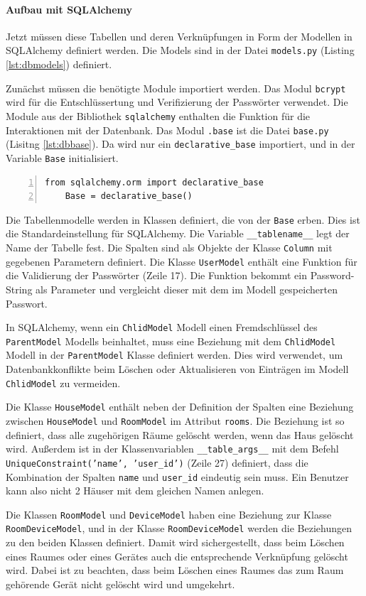 \documentclass[12pt, letterpaper]{article}
\begin{document}
  \paragraph{Aufbau mit SQLAlchemy}
  \par \textbf{}
  \par Jetzt müssen diese Tabellen und deren Verknüpfungen in Form der Modellen in SQLAlchemy definiert werden. Die Models sind in der Datei \texttt{models.py} (Listing \ref{lst:dbmodels}) definiert. 
  \par Zunächst müssen die benötigte Module importiert werden. Das Modul \texttt{bcrypt} wird für die Entschlüssertung und Verifizierung der Passwörter verwendet. Die Module aus der Bibliothek \texttt{sqlalchemy} enthalten die Funktion für die Interaktionen mit der Datenbank. Das Modul \texttt{.base} ist die Datei \texttt{base.py} (Lisitng \ref{lst:dbbase}). Da wird nur ein \texttt{declarative\_base} importiert, und in der Variable \texttt{Base} initialisiert. 
  \begin{lstlisting}[frame=single, style=py, numbers=left, label={lst:dbbase}, caption={db: base.py}]
    from sqlalchemy.orm import declarative_base
    Base = declarative_base()
  \end{lstlisting}  
  \par Die Tabellenmodelle werden in Klassen definiert, die von der \texttt{Base} erben. Dies ist die Standardeinstellung für SQLAlchemy. Die Variable \texttt{\_\_tablename\_\_} legt der Name der Tabelle fest. Die Spalten sind als Objekte der Klasse \texttt{Column} mit gegebenen Parametern definiert. Die Klasse \texttt{UserModel} enthält eine Funktion für die Validierung der Passwörter (Zeile 17). Die Funktion bekommt ein Password-String als Parameter und vergleicht dieser mit dem im Modell gespeicherten Passwort.
  \par In SQLAlchemy, wenn ein \texttt{ChlidModel} Modell einen Fremdschlüssel des \texttt{ParentModel} Modells beinhaltet, muss eine Beziehung mit dem \texttt{ChlidModel} Modell in der \texttt{ParentModel} Klasse definiert werden. Dies wird verwendet, um Datenbankkonflikte beim Löschen oder Aktualisieren von Einträgen im Modell \texttt{ChlidModel} zu vermeiden.
  \par Die Klasse \texttt{HouseModel} enthält neben der Definition der Spalten eine Beziehung zwischen \texttt{HouseModel} und \texttt{RoomModel} im Attribut \texttt{rooms}. Die Beziehung ist so definiert, dass alle zugehörigen Räume gelöscht werden, wenn das Haus gelöscht wird. Außerdem ist in der Klassenvariablen \texttt{\_\_table\_args\_\_} mit dem Befehl \texttt{UniqueConstraint('name', 'user\_id')} (Zeile 27) definiert, dass die Kombination der Spalten \texttt{name} und \texttt{user\_id} eindeutig sein muss. Ein Benutzer kann also nicht 2 Häuser mit dem gleichen Namen anlegen.
  \par Die Klassen \texttt{RoomModel} und \texttt{DeviceModel} haben eine Beziehung zur Klasse \texttt{RoomDeviceModel}, und in der Klasse \texttt{RoomDeviceModel} werden die Beziehungen zu den beiden Klassen definiert. Damit wird sichergestellt, dass beim Löschen eines Raumes oder eines Gerätes auch die entsprechende Verknüpfung gelöscht wird. Dabei ist zu beachten, dass beim Löschen eines Raumes das zum Raum gehörende Gerät nicht gelöscht wird und umgekehrt.
\end{document}
